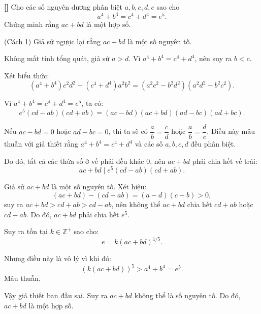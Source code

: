 \documentclass[../04-diophantine-equations.tex]{subfiles}
\begin{document}
\begin{example*}\label{example:USA-2015-MO-P5}\textbf{[]}
	Cho các số nguyên dương phân biệt \( a, b, c, d, e \) sao cho
	\[
		a^4 + b^4 = c^4 + d^4 = e^5.
	\]
	Chứng minh rằng \( ac + bd \) là một hợp số.
\end{example*}

\begin{soln}(Cách 1)\footnotemark
	Giả sử ngược lại rằng \( ac + bd \) là một số nguyên tố.

	Không mất tính tổng quát, giả sử \( a > d \). Vì \( a^4 + b^4 = c^4 + d^4 \), nên suy ra \( b < c \).
	
	Xét biểu thức:
	\[
		(a^4 + b^4)c^2d^2 - (c^4 + d^4)a^2b^2 = (a^2c^2 - b^2d^2)(a^2d^2 - b^2c^2).
	\]
	
	Vì \( a^4 + b^4 = c^4 + d^4 = e^5 \), ta có:
	\[
		e^5 (cd - ab)(cd + ab) = (ac - bd)(ac + bd)(ad - bc)(ad + bc).
	\]
	
	Nếu \( ac - bd = 0 \) hoặc \( ad - bc = 0 \), thì ta sẽ có \( \dfrac{a}{b} = \dfrac{c}{d} \) hoặc \( \dfrac{a}{b} = \dfrac{d}{c} \).
	Điều này mâu thuẫn với giả thiết rằng \( a^4 + b^4 = c^4 + d^4 \) và các số \( a, b, c, d \) đều phân biệt.
	
	Do đó, tất cả các thừa số ở vế phải đều khác 0, nên \( ac + bd \) phải chia hết vế trái:
	\[
		ac + bd \mid e^5 (cd - ab)(cd + ab).
	\]
	
	Giả sử \( ac + bd \) là một số nguyên tố. Xét hiệu:
	\[
		(ac + bd) - (cd + ab) = (a - d)(c - b) > 0,
	\]
	suy ra \( ac + bd > cd + ab > cd - ab \), nên không thể \( ac + bd \) chia hết \( cd + ab \) hoặc \( cd - ab \). Do đó, \( ac + bd \) phải chia hết \( e^5 \).
	
	Suy ra tồn tại \( k \in \mathbb{Z}^+ \) sao cho:
	\[
		e = k(ac + bd)^{1/5}.
	\]
	
	Nhưng điều này là vô lý vì khi đó:
	\[
		(k(ac + bd))^5 > a^4 + b^4 = e^5.
	\]
	Mâu thuẫn.
	
	Vậy giả thiết ban đầu sai. Suy ra \( ac + bd \) không thể là số nguyên tố. Do đó, \( ac + bd \) là một hợp số.
\end{soln}

\end{document}
